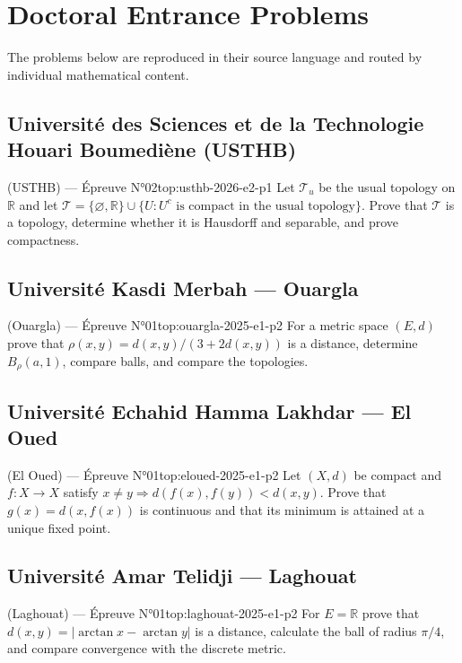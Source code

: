 \chapter{Doctoral Entrance Problems}
\label{ch:problems}

The problems below are reproduced in their source language and routed by individual mathematical content.
\newpage
\section{Université des Sciences et de la Technologie Houari Boumediène (USTHB)}
\begin{problem}{(USTHB) — Épreuve N°02}{top:usthb-2026-e2-p1}
Let $\mathcal T_u$ be the usual topology on $\mathbb R$ and let $\mathcal T=\{\varnothing,\mathbb R\}\cup\{U:U^c\text{ is compact in the usual topology}\}$. Prove that $\mathcal T$ is a topology, determine whether it is Hausdorff and separable, and prove compactness.
\end{problem}
\newpage
\section{Université Kasdi Merbah --- Ouargla}
\begin{problem}{(Ouargla) — Épreuve N°01}{top:ouargla-2025-e1-p2}
For a metric space $(E,d)$ prove that $\rho(x,y)=d(x,y)/(3+2d(x,y))$ is a distance, determine $B_\rho(a,1)$, compare balls, and compare the topologies.
\end{problem}
\newpage
\section{Université Echahid Hamma Lakhdar --- El Oued}
\begin{problem}{(El Oued) — Épreuve N°01}{top:eloued-2025-e1-p2}
Let $(X,d)$ be compact and $f:X\to X$ satisfy $x\ne y\Rightarrow d(f(x),f(y))<d(x,y)$. Prove that $g(x)=d(x,f(x))$ is continuous and that its minimum is attained at a unique fixed point.
\end{problem}
\newpage
\section{Université Amar Telidji --- Laghouat}
\begin{problem}{(Laghouat) — Épreuve N°01}{top:laghouat-2025-e1-p2}
For $E=\mathbb R$ prove that $d(x,y)=|\arctan x-\arctan y|$ is a distance, calculate the ball of radius $\pi/4$, and compare convergence with the discrete metric.
\end{problem}
